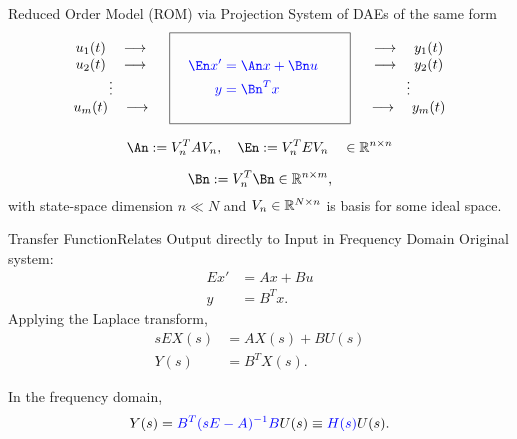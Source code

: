 \documentclass{beamer}
\newcommand{\Balert}[1]{\textcolor{blue}{#1}}
\begin{document}
\begin{frame}{Reduced Order Model (ROM) via Projection}
   System of DAEs of the same form
   \begin{equation*}  
   \begin{array}{c}
   u_1(t)\quad\longrightarrow \\ u_2(t)\quad\longrightarrow\\ \vdots\\u_\nin(t)\quad\longrightarrow
   \end{array}
  \quad
  \boxed{\Balert{%
 	    \begin{aligned}
 	    \\
 			\quad \En x' &=  \An x + \Bn u\quad\\
 			y &= \Bn^Tx\\
 			\\
 		\end{aligned}	
      }
  	}
  \quad	
		 \begin{array}{c}
	 \longrightarrow\quad y_1(t)\\ \longrightarrow\quad y_2(t)\\ \vdots\\\longrightarrow\quad y_\nin(t)
   \end{array} 
 \end{equation*}
 
 \[
 	\An := V_n^TAV_n, \quad \En := V_n^TEV_n \quad\in \R^{n\times n}
 \]
 
 \[
 	\Bn := V_n^T\Bn \in\R^{n\times \nin},
 \]
with state-space dimension $n \ll N$ and $V_n\in\mathbb{R}^{N\times n}$ is
basis for some ideal space.  
\end{frame}






\begin{frame}{Transfer Function}{Relates Output directly to Input in Frequency Domain}
Original system:
  \begin{align*}
   	E x' &=  Ax + Bu\\
   	 y &= B^Tx.
 \end{align*}
 Applying the Laplace transform,
  \begin{align*}
      sEX(s) &=  AX(s) + BU(s)\\
      Y(s) &= B^TX(s).
 \end{align*}

In the frequency domain,
\[
Y(s) = \Balert{B^T(sE-A)^{-1}B} U(s) \equiv \Balert{H(s)}U(s).
\]
\end{frame}
\end{document}
